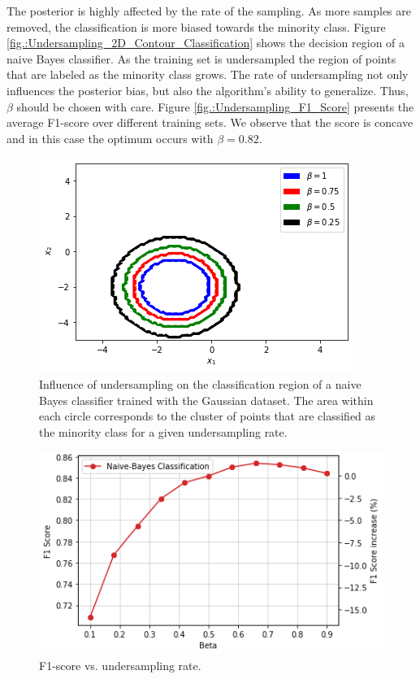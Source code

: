 \documentclass[conference]{IEEEtran}
\begin{document}
		The posterior is highly affected by the rate of the sampling. As more samples are removed, the classification is more biased towards the minority class. Figure \ref{fig.:Undersampling_2D_Contour_Classification} shows the decision region of a naive Bayes classifier. As the training set is undersampled the region of points that are labeled as the minority class grows. The rate of undersampling not only influences the posterior bias, but also the algorithm's ability to generalize. Thus, $\beta$ should be chosen with care. Figure \ref{fig.:Undersampling_F1_Score} presents the average F1-score over different training sets. We observe that the score is concave and in this case the optimum occurs with $\beta=0.82$.

			\begin{figure}
				\includegraphics[scale=0.3]{Undersampling_2D_Contour_Classification}
				\centering
				\caption{Influence of undersampling on the classification region of a naive Bayes classifier trained with the Gaussian dataset. The area within each circle corresponds to the cluster of points that are classified as the minority class for a given undersampling rate.}
				\label{fig:Undersampling_2D_Contour_Classification}
			\end{figure}
		
			\begin{figure}
				\includegraphics[scale=0.3]{Undersampling_F1_Score}
				\centering
				\caption{F1-score vs. undersampling rate.}
				\label{fig:Undersampling_F1_Score}
			\end{figure}
		
\end{document}
